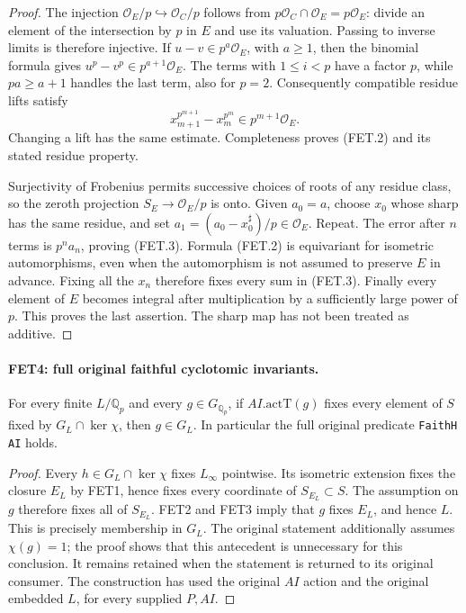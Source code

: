 \documentclass[11pt,a4paper]{article}
\numberwithin{equation}{section}
\theoremstyle{remark}\newtheorem{remark}[theorem]{Remark}
\begin{document}
\begin{proof}
The injection $\mathcal O_E/p\hookrightarrow\mathcal O_C/p$
follows from $p\mathcal O_C\cap\mathcal O_E=p\mathcal O_E$:
divide an element of the intersection by $p$ in $E$ and use its
valuation. Passing to inverse limits is therefore injective.
If $u-v\in p^a\mathcal O_E$, with $a\geq1$, then the binomial
formula gives $u^p-v^p\in p^{a+1}\mathcal O_E$. The terms with
$1\leq i<p$ have a factor $p$, while $pa\geq a+1$ handles the
last term, also for $p=2$. Consequently compatible residue lifts
satisfy
\[
 x_{m+1}^{p^{m+1}}-x_m^{p^m}\in p^{m+1}\mathcal O_E.
\]
Changing a lift has the same estimate. Completeness proves (FET.2)
and its stated residue property.

Surjectivity of Frobenius permits successive choices of roots of
any residue class, so the zeroth projection
$S_E\to\mathcal O_E/p$ is onto. Given $a_0=a$, choose $x_0$
whose sharp has the same residue, and set
$a_1=(a_0-x_0^\sharp)/p\in\mathcal O_E$. Repeat.
The error after $n$ terms is $p^n a_n$, proving (FET.3).
Formula (FET.2) is equivariant for isometric automorphisms, even
when the automorphism is not assumed to preserve $E$ in advance.
Fixing all the $x_n$ therefore fixes every sum in (FET.3).
Finally every element of $E$ becomes integral after multiplication
by a sufficiently large power of $p$. This proves the last assertion.
The sharp map has not been treated as additive.
\end{proof}

\paragraph{FET4: full original faithful cyclotomic invariants.}
\label{claim:FET4}
For every finite $L/\mathbb Q_p$ and every
$g\in G_{\mathbb Q_p}$, if $AI.\mathrm{actT}(g)$ fixes every
element of $S$ fixed by $G_L\cap\ker\chi$, then $g\in G_L$.
In particular the full original predicate \texttt{Faith\allowbreak H AI} holds.

\begin{proof}
Every $h\in G_L\cap\ker\chi$ fixes $L_\infty$ pointwise.
Its isometric extension fixes the closure $E_L$ by FET1, hence
fixes every coordinate of $S_{E_L}\subset S$.
The assumption on $g$ therefore fixes all of $S_{E_L}$.
FET2 and FET3 imply that $g$ fixes $E_L$, and hence $L$.
This is precisely membership in $G_L$.
The original statement additionally assumes $\chi(g)=1$; the
proof shows that this antecedent is unnecessary for this conclusion.
It remains retained when the statement is returned to its original
consumer. The construction has used the original $AI$ action and
the original embedded $L$, for every supplied $P,AI$.
\end{proof}
\end{document}
